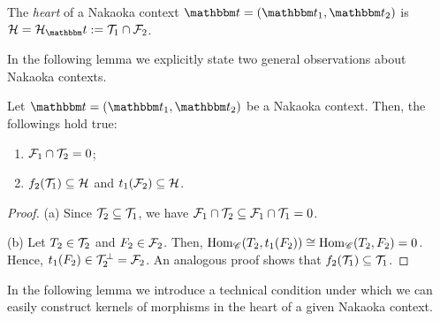 \begin{definition}
  The \emph{heart} of a Nakaoka context $\t=(\t_1,\t_2)$ is $\clH=\clH_\t:=\T_1\cap\F_2$.
\end{definition}

In the following lemma we explicitly state two general observations about Nakaoka contexts.

\begin{lemma}\label{5:lem:2}
Let $\t=(\t_1,\t_2)$ be a Nakaoka context. Then, the followings hold true:
\begin{enumerate}[label=(\alph*)]
\item $\mathcal{F}_1\cap\mathcal{T}_2=0$;
\item $f_2(\mathcal{T}_1)\subseteq\mathcal{H}$ and $t_1(\mathcal{F}_2)\subseteq\mathcal{H}$.
\end{enumerate}
\end{lemma}
\begin{proof}
(a) Since $\mathcal{T}_2\subseteq\mathcal{T}_1$, we have $\mathcal{F}_1\cap\mathcal{T}_2\subseteq \mathcal{F}_1\cap\mathcal{T}_1=0$.

\smallskip\noindent
(b) Let $T_2\in\mathcal{T}_2$ and $F_2\in\mathcal{F}_2$. Then, $\operatorname{Hom}_\mathscr{C}(T_2,t_1(F_2))\cong \operatorname{Hom}_\mathscr{C}(T_2,F_2)=0$.
Hence, $t_1(F_2)\in\mathcal{T}_2^\perp = \mathcal{F}_2$. An analogous proof shows that $f_2(\mathcal{T}_1)\subseteq\mathcal{T}_1$.
\end{proof}

In the following lemma we introduce a technical condition under which we can easily construct kernels of morphisms in the heart of a given Nakaoka context.

